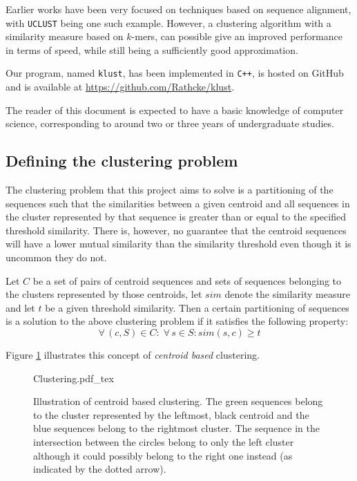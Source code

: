 Earlier works have been very focused on techniques based on sequence alignment,
with \texttt{UCLUST} being one such example. However, a clustering algorithm
with a similarity measure based on $k$-mers, can possible give an improved
performance in terms of speed, while still being a sufficiently good
approximation.

Our program, named \texttt{klust}, has been implemented in \texttt{C++}, is
hosted on GitHub and is available at \url{https://github.com/Rathcke/klust}.

The reader of this document is expected to have a basic knowledge of computer
science, corresponding to around two or three years of undergraduate studies.


\subsection{Defining the clustering problem}

The clustering problem that this project aims to solve is a partitioning of the
sequences such that the similarities between a given centroid and all sequences
in the cluster represented by that sequence is greater than or equal to the
specified threshold similarity. There is, however, no guarantee that the
centroid sequences will have a lower mutual similarity than the similarity
threshold even though it is uncommon they do not.

Let $C$ be a set of pairs of centroid sequences and sets of sequences belonging
to the clusters represented by those centroids, let $sim$ denote the similarity
measure and let $t$ be a given threshold similarity. Then a certain
partitioning of sequences is a solution to the above clustering problem if it
satisfies the following property:
\[
  \forall\, (c,S) \in C:\; \forall\, s \in S: sim(s,c) \geq t
\]

Figure \ref{fig:clustering_concept} illustrates this concept of \emph{centroid
based} clustering.

\begin{figure}[h!]
  \centering
  \def\svgwidth{0.9\columnwidth}
  {Clustering.pdf_tex}
  \caption{Illustration of centroid based clustering. The green sequences
    belong to the cluster represented by the leftmost, black centroid and the
    blue sequences belong to the rightmost cluster. The sequence in the
    intersection between the circles belong to only the left cluster although
    it could possibly belong to the right one instead (as indicated by
    the dotted arrow).}
  \label{fig:clustering_concept}
\end{figure}
